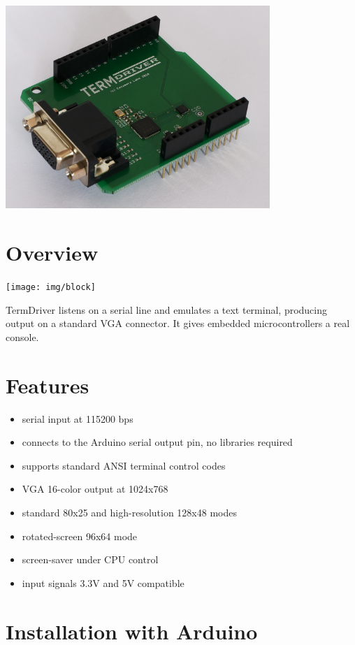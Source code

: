 \documentclass{article}
\begin{document}
\newpage
\begin{center}
\includegraphics[width=0.75\textwidth]{img/img1}
\end{center}
\tableofcontents
\listoffigures

\section{Overview}

\begin{center}
\texttt{[image: img/block]}
\end{center}

TermDriver listens on a serial line and emulates a text terminal,
producing output on a standard VGA connector.
It gives embedded microcontrollers a real console.

\section{Features}
\begin{itemize}
\item serial input at 115200 bps
\item connects to the Arduino serial output pin, no libraries required
\item supports standard ANSI terminal control codes
\item VGA 16-color output at 1024x768 
\item standard 80x25 and high-resolution 128x48 modes
\item rotated-screen 96x64 mode
\item screen-saver under CPU control
\item input signals 3.3V and 5V compatible
\end{itemize}

\newpage
\section{Installation with Arduino}
\end{document}
